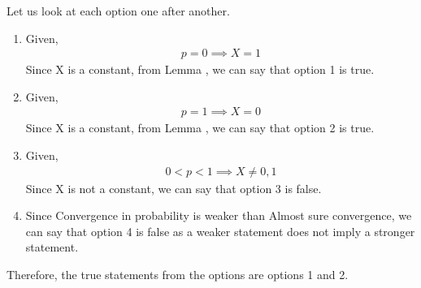 \documentclass[journal,12pt,twocolumn]{IEEEtran}
\begin{document}
Let us look at each option one after another.
\begin{enumerate}
    \item Given,
    \begin{align}\nonumber
        p = 0 \implies X = 1
    \end{align}
    Since X is a constant, from Lemma , we can say that option 1 is true.
    \item Given,
      \begin{align}\nonumber
        p = 1 \implies X = 0
    \end{align}
    Since X is a constant, from Lemma , we can say that option 2 is true.
    \item Given,
      \begin{align}\nonumber
        0 < p < 1 \implies X \neq 0,1 
    \end{align}
    Since X is not a constant, we can say that option 3 is false.
    \item Since Convergence in probability is weaker than Almost sure convergence, we can say that option 4 is false as a weaker statement does not imply a stronger statement.
\end{enumerate}
Therefore, the true statements from the options are options 1 and 2.
\end{document}
